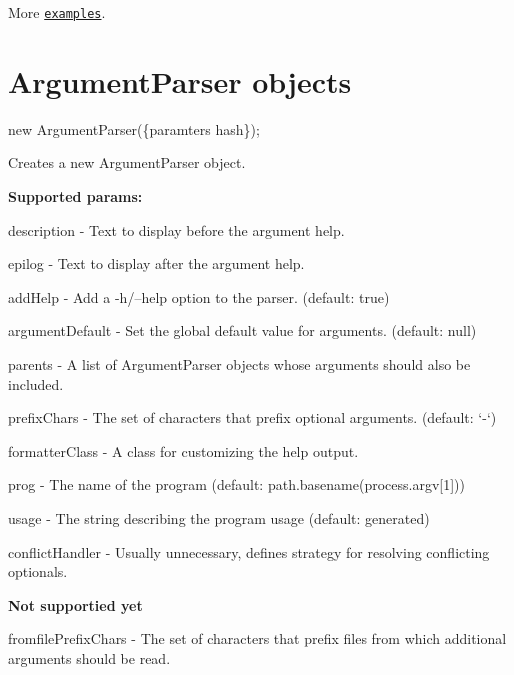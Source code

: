 More \href{https://github.com/nodeca/argparse/tree/master/examples}{\tt examples}.

\section*{Argument\+Parser objects }


\begin{DoxyCode}
new ArgumentParser(\{paramters hash\});
\end{DoxyCode}


Creates a new Argument\+Parser object.

{\bfseries Supported params\+:}


\begin{DoxyItemize}
\item {\ttfamily description} -\/ Text to display before the argument help.
\item {\ttfamily epilog} -\/ Text to display after the argument help.
\item {\ttfamily add\+Help} -\/ Add a -\/h/–help option to the parser. (default\+: true)
\item {\ttfamily argument\+Default} -\/ Set the global default value for arguments. (default\+: null)
\item {\ttfamily parents} -\/ A list of Argument\+Parser objects whose arguments should also be included.
\item {\ttfamily prefix\+Chars} -\/ The set of characters that prefix optional arguments. (default\+: ‘-\/‘)
\item {\ttfamily formatter\+Class} -\/ A class for customizing the help output.
\item {\ttfamily prog} -\/ The name of the program (default\+: {\ttfamily path.\+basename(process.\+argv\mbox{[}1\mbox{]})})
\item {\ttfamily usage} -\/ The string describing the program usage (default\+: generated)
\item {\ttfamily conflict\+Handler} -\/ Usually unnecessary, defines strategy for resolving conflicting optionals.
\end{DoxyItemize}

{\bfseries Not supportied yet}


\begin{DoxyItemize}
\item {\ttfamily fromfile\+Prefix\+Chars} -\/ The set of characters that prefix files from which additional arguments should be read.
\end{DoxyItemize}

